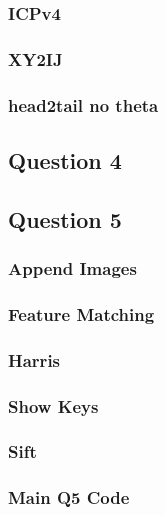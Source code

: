 		\subsubsection{ICPv4}
			
		\pagebreak
		\subsubsection{XY2IJ}
			
		\pagebreak
		\subsubsection{head2tail no theta}
			
		\pagebreak
		
	\subsection{Question 4}
	\pagebreak
	
	\subsection{Question 5}
		\subsubsection{Append Images}
		
		\pagebreak
		\subsubsection{Feature Matching}
		
		\pagebreak
		\subsubsection{Harris}
		
		\pagebreak
		\subsubsection{Show Keys}
		
		\pagebreak
		\subsubsection{Sift}
		
		\pagebreak
		\subsubsection{Main Q5 Code}
		
		\pagebreak
	
